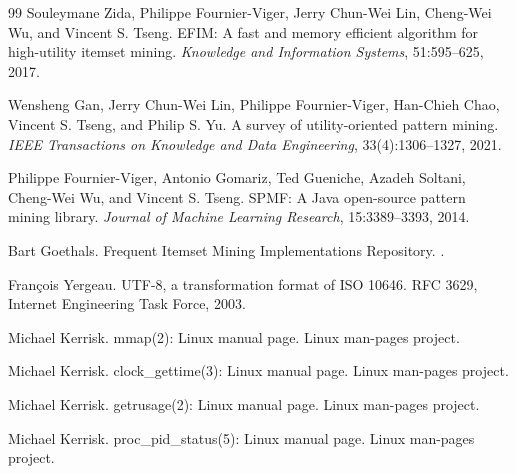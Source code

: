 \documentclass[11pt,a4paper]{article}
\begin{document}
\begin{thebibliography}{99}
Souleymane Zida, Philippe Fournier-Viger, Jerry Chun-Wei Lin, Cheng-Wei Wu, and Vincent S. Tseng.
\newblock EFIM: A fast and memory efficient algorithm for high-utility itemset mining.
\newblock \emph{Knowledge and Information Systems}, 51:595--625, 2017.

Wensheng Gan, Jerry Chun-Wei Lin, Philippe Fournier-Viger, Han-Chieh Chao, Vincent S. Tseng, and Philip S. Yu.
\newblock A survey of utility-oriented pattern mining.
\newblock \emph{IEEE Transactions on Knowledge and Data Engineering}, 33(4):1306--1327, 2021.

Philippe Fournier-Viger, Antonio Gomariz, Ted Gueniche, Azadeh Soltani, Cheng-Wei Wu, and Vincent S. Tseng.
\newblock SPMF: A Java open-source pattern mining library.
\newblock \emph{Journal of Machine Learning Research}, 15:3389--3393, 2014.

Bart Goethals.
\newblock Frequent Itemset Mining Implementations Repository.
.

Fran\c{c}ois Yergeau.
\newblock UTF-8, a transformation format of ISO 10646.
\newblock RFC 3629, Internet Engineering Task Force, 2003.

Michael Kerrisk.
\newblock mmap(2): Linux manual page.
\newblock Linux man-pages project.

Michael Kerrisk.
\newblock clock\_gettime(3): Linux manual page.
\newblock Linux man-pages project.

Michael Kerrisk.
\newblock getrusage(2): Linux manual page.
\newblock Linux man-pages project.

Michael Kerrisk.
\newblock proc\_pid\_status(5): Linux manual page.
\newblock Linux man-pages project.

\end{thebibliography}
\end{document}
